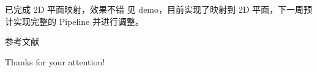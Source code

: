 \documentclass{ctexbeamer}
\begin{document}
\begin{frame}{已完成 2D 平面映射，效果不错}
见 demo，目前实现了映射到 2D 平面，下一周预计实现完整的 Pipeline 并进行调整。
\end{frame}

\begin{frame}[allowframebreaks]{参考文献}
  
  
\end{frame}

\begin{frame}
  \begin{center}
    {\Huge\calligra Thanks for your attention!}
  \end{center}
\end{frame}

\end{document}
